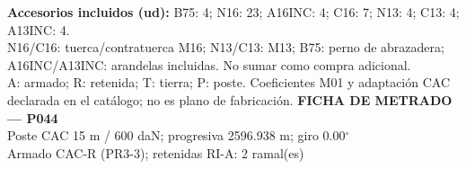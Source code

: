 \begingroup\scriptsize
\textbf{Accesorios incluidos (ud):} B75: 4; N16: 23; A16INC: 4; C16: 7; N13: 4; C13: 4; A13INC: 4.\\
N16/C16: tuerca/contratuerca M16; N13/C13: M13; B75: perno de abrazadera; A16INC/A13INC: arandelas incluidas. No sumar como compra adicional.\\
A: armado; R: retenida; T: tierra; P: poste. Coeficientes M01 y adaptación CAC declarada en el catálogo; no es plano de fabricación.
\endgroup\endgroup
\clearpage{}
\begingroup\small\setlength{\parskip}{3pt}\renewcommand{\arraystretch}{1.05}
\textbf{\large FICHA DE METRADO — P044}\\[4pt]
Poste CAC 15 m / 600 daN; progresiva 2596.938 m; giro 0.00\ensuremath{^\circ}\\
Armado CAC-R (PR3-3); retenidas RI-A: 2 ramal(es)\\
\begingroup\scriptsize
